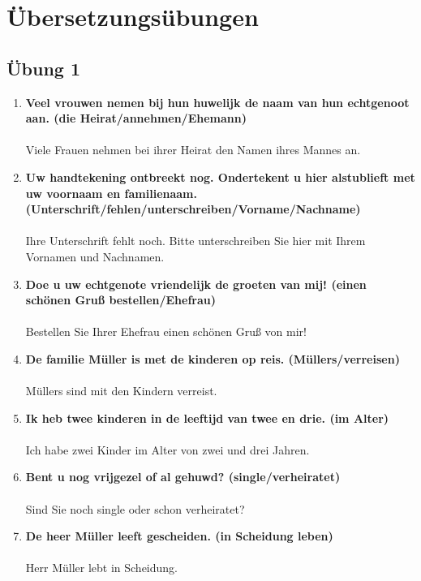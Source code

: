 \documentclass[main.tex]{subfiles}
\begin{document}
\chapter{Übersetzungsübungen}
\section{Übung 1}
\begin{enumerate}
\item \textbf{Veel vrouwen nemen bij hun huwelijk de naam van hun echtgenoot aan. (die Heirat/annehmen/Ehemann)}\\ \\
Viele Frauen nehmen bei ihrer Heirat den Namen ihres Mannes an.\\
\item \textbf{Uw handtekening ontbreekt nog. Ondertekent u hier alstublieft met uw voornaam en familienaam. (Unterschrift/fehlen/unterschreiben/Vorname/Nachname)}\\ \\
Ihre Unterschrift fehlt noch. Bitte unterschreiben Sie hier mit Ihrem Vornamen und Nachnamen.
\\
\item \textbf{Doe u uw echtgenote vriendelijk de groeten van mij! (einen schönen Gruß bestellen/Ehefrau)}\\ \\
Bestellen Sie Ihrer Ehefrau einen schönen Gruß von mir!
\\
\item \textbf{De familie Müller is met de kinderen op reis. (Müllers/verreisen)}\\ \\
Müllers sind mit den Kindern verreist.
\\
\item \textbf{Ik heb twee kinderen in de leeftijd van twee en drie. (im Alter)}\\ \\
Ich habe zwei Kinder im Alter von zwei und drei Jahren.
\\
\item \textbf{Bent u nog vrijgezel of al gehuwd? (single/verheiratet)}\\ \\
Sind Sie noch single oder schon verheiratet?
\\
\item \textbf{De heer Müller leeft gescheiden. (in Scheidung leben)}\\ \\
Herr Müller lebt in Scheidung.

\end{enumerate}
\end{document}
